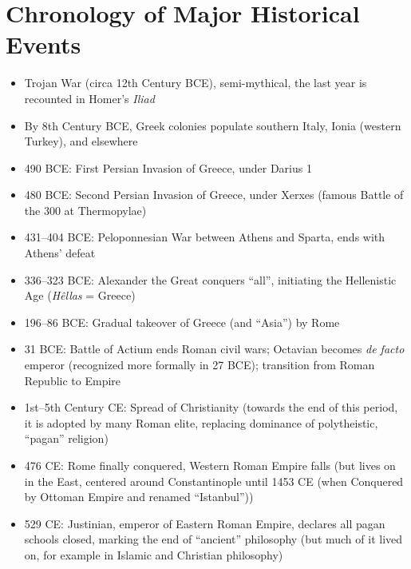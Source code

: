 \documentclass[11pt]{article}
\begin{document}
\section*{Chronology of Major Historical Events}
\begin{itemize}
\item{Trojan War (circa 12th Century BCE), semi-mythical, the last year is recounted in Homer's \emph{Iliad}}
\item{By 8th Century BCE, Greek colonies populate southern Italy, Ionia (western Turkey), and elsewhere}
\item{490 BCE: First Persian Invasion of Greece, under Darius 1}
\item{480 BCE: Second Persian Invasion of Greece, under Xerxes (famous Battle of the 300 at Thermopylae)}
\item{431--404 BCE: Peloponnesian War between Athens and Sparta, ends with Athens' defeat}
\item{336--323 BCE: Alexander the Great conquers ``all'', initiating the Hellenistic Age (\emph{H\^{e}llas} = Greece)}
\item{196--86 BCE: Gradual takeover of Greece (and ``Asia'') by Rome}
\item{31 BCE: Battle of Actium ends Roman civil wars; Octavian becomes \emph{de facto} emperor (recognized more formally in 27 BCE); transition from Roman Republic to Empire}
\item{1st--5th Century CE: Spread of Christianity (towards the end of this period, it is  adopted by many Roman elite, replacing dominance of polytheistic, ``pagan'' religion)}
\item{476 CE: Rome finally conquered, Western Roman Empire falls (but lives on in the East, centered around Constantinople until 1453 CE (when Conquered by Ottoman Empire and renamed ``Istanbul''))}
\item{529 CE: Justinian, emperor of Eastern Roman Empire, declares all pagan schools closed, marking the end of ``ancient'' philosophy (but much of it lived on, for example in Islamic and Christian philosophy)}
\end{itemize}
\end{document}
